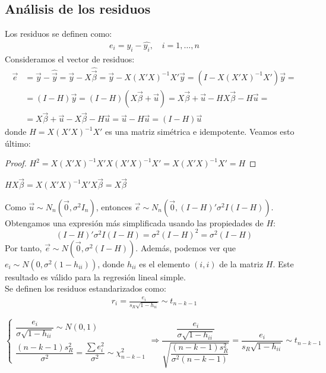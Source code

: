 \subsection{Análisis de los residuos}

\noindent Los residuos se definen como:
\begin{align*}
    e_i = y_i - \widehat{y_i}, \quad i = 1, \dots, n
\end{align*}
Consideramos el vector de residuos:
\begin{align*}
    \vec{e} & = \vec{y} - \widehat{\vec{y}} = \vec{y} - X\widehat{\vec{\beta}} = \vec{y} - X(X'X)^{-1}X'\vec{y} = (I - X(X'X)^{-1}X')\vec{y} = \\
            & = (I-H)\vec{y} = (I-H)(X\vec{\beta}+\vec{u}) = X\vec{\beta} + \vec{u} - HX\vec{\beta} - H\vec{u} =                       \\
            & = X\vec{\beta} + \vec{u} - X\vec{\beta} - H\vec{u} = \vec{u} - H\vec{u} = (I-H)\vec{u}
\end{align*}
donde $H = X(X'X)^{-1}X'$ es una matriz simétrica e idempotente. Veamos esto último:
\begin{proof}
    $H^2 = X(X'X)^{-1}X'X(X'X)^{-1}X' = X(X'X)^{-1}X' = H$
\end{proof}

\begin{obs}
    $HX\vec{\beta} = X(X'X)^{-1}X'X\vec{\beta} = X\vec{\beta}$
\end{obs}

\noindent Como $\vec{u} \sim N_n(\vec{0}, \sigma^2I_n)$, entonces $\vec{e} \sim N_n(\vec{0}, (I-H)'\sigma^2I(I-H))$.
Obtengamos una expresión más simplificada usando las propiedades de $H$:
$$(I-H)'\sigma^2I(I-H) = \sigma^2(I-H)^2 = \sigma^2(I-H)$$
Por tanto, $\vec{e} \sim N(\vec{0}, \sigma^2(I-H))$.
Además, podemos ver que $e_i \sim N(0, \sigma^2(1-h_{ii}))$, donde $h_{ii}$ es el elemento $(i,i)$ de la matriz $H$.
Este resultado es válido para la regresión lineal simple.
\\
\newline
Se definen los residuos estandarizados como:
\begin{align*}
    \boxed{
    r_i = \frac{e_i}{s_R\sqrt{1-h_{ii}}} \sim t_{n-k-1}
    }
\end{align*}

\begin{obs}
    $$\begin{cases}
            \dfrac{e_i}{\sigma\sqrt{1-h_{ii}}} \sim N(0, 1) \\
            \dfrac{(n-k-1)s_R^2}{\sigma^2} = \dfrac{\sum e_i^2}{\sigma^2} \sim \chi^2_{n-k-1}
        \end{cases} \Rightarrow
        \frac{\dfrac{e_i}{\sigma\sqrt{1-h_{ii}}}}{\sqrt{\dfrac{(n-k-1)s_R^2}{\sigma^2(n-k-1)}}} = \frac{e_i}{s_R\sqrt{1-h_{ii}}} \sim t_{n-k-1}$$
\end{obs}

